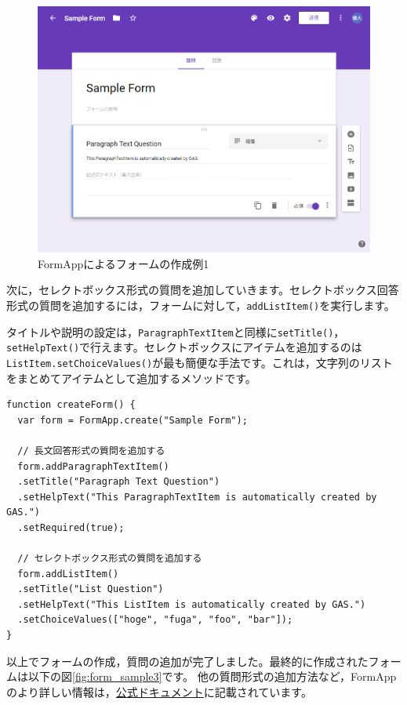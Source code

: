 \documentclass[uplatex,a4j]{jsarticle}
\begin{document}
\begin{figure}[H]
 \centering
 \includegraphics[keepaspectratio, scale=0.5]{images/form_sample1.png}
 \caption{FormAppによるフォームの作成例1}
 \label{fig:form_sample1}
\end{figure}

次に，セレクトボックス形式の質問を追加していきます。セレクトボックス回答形式の質問を追加するには，フォームに対して，\verb|addListItem()|を実行します。


タイトルや説明の設定は，\verb|ParagraphTextItem|と同様に\verb|setTitle()|，\verb|setHelpText()|で行えます。セレクトボックスにアイテムを追加するのは\verb|ListItem.setChoiceValues()|が最も簡便な手法です。これは，文字列のリストをまとめてアイテムとして追加するメソッドです。

\begin{lstlisting}[basicstyle=\ttfamily\footnotesize,frame=single,caption=FormApp sample 5]
function createForm() {
  var form = FormApp.create("Sample Form");
  
  // 長文回答形式の質問を追加する
  form.addParagraphTextItem()
  .setTitle("Paragraph Text Question")
  .setHelpText("This ParagraphTextItem is automatically created by GAS.")
  .setRequired(true);
  
  // セレクトボックス形式の質問を追加する
  form.addListItem()
  .setTitle("List Question")
  .setHelpText("This ListItem is automatically created by GAS.")
  .setChoiceValues(["hoge", "fuga", "foo", "bar"]);
}
\end{lstlisting}

以上でフォームの作成，質問の追加が完了しました。最終的に作成されたフォームは以下の図\ref{fig:form_sample3}です。
他の質問形式の追加方法など，FormAppのより詳しい情報は，\href{https://developers.google.com/apps-script/reference/forms}{公式ドキュメント}に記載されています。
\end{document}
